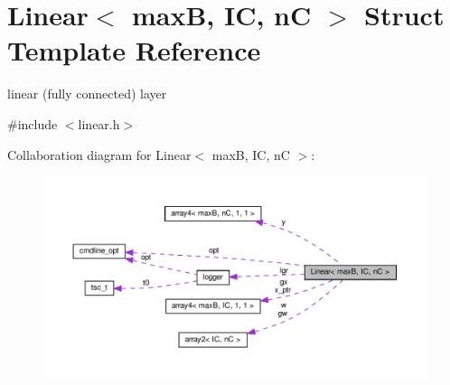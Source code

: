 \hypertarget{structLinear}{}\section{Linear$<$ maxB, IC, nC $>$ Struct Template Reference}
\label{structLinear}


linear (fully connected) layer  




{\ttfamily \#include $<$linear.\+h$>$}



Collaboration diagram for Linear$<$ maxB, IC, nC $>$\+:\nopagebreak
\begin{figure}[H]
\begin{center}
\leavevmode
\includegraphics[width=350pt]{structLinear__coll__graph}
\end{center}
\end{figure}
